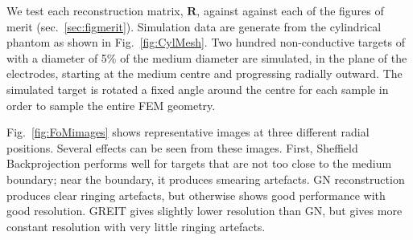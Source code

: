 \documentclass[12pt]{iopart}
\newcommand{\RB}{\mbox{$\mathbf{R}$}}
\begin{document}
We test each reconstruction matrix, $\RB$,
against against each of the figures of merit 
(sec.\ \ref{sec:figmerit}). Simulation data
are generate from the cylindrical phantom
as shown in Fig.\ \ref{fig:CylMesh}. 
Two hundred 
non-conductive targets of with a diameter of
5\% of the medium diameter are simulated,
 in the plane of the electrodes,
starting at the medium centre and 
progressing radially outward. The simulated 
target is rotated a fixed angle around the centre
for each sample in order to sample the entire
FEM geometry.

Fig.\ \ref{fig:FoMimages} shows representative
images at three different radial positions.
Several effects can be seen from these images.
First, Sheffield Backprojection performs well
for targets that are not too close to the 
medium boundary; near the boundary, it produces
smearing artefacts. GN reconstruction produces
clear ringing artefacts, but otherwise shows
good performance with good resolution. 
GREIT gives slightly lower resolution than
GN, but gives more constant resolution with
very little ringing artefacts.
\end{document}
